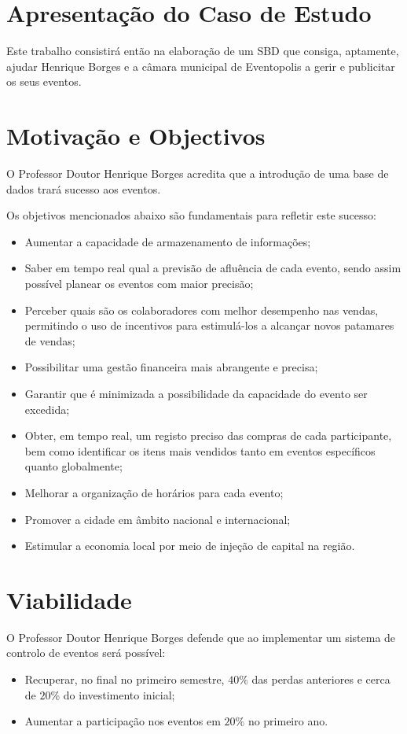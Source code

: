 \documentclass[a4paper,12pt]{scrreprt}
\begin{document}
    \section{Apresentação do Caso de Estudo}
    Este trabalho consistirá então na elaboração de um SBD que consiga, aptamente, ajudar Henrique Borges
    e a c\^amara municipal de Eventopolis a gerir e publicitar os seus eventos.
    
    \section{Motivação e Objectivos}
    O Professor Doutor Henrique Borges acredita que a introdu\c{c}\~{a}o de uma base de dados
    trar\'{a} sucesso aos eventos.

    Os objetivos mencionados abaixo s\~{a}o fundamentais para refletir este sucesso:
    \begin{itemize}
    \item Aumentar a capacidade de armazenamento de informa\c{c}\~{o}es;
    \item Saber em tempo real qual a previsão de afluência de cada evento, sendo assim possível
planear os eventos com maior precisão;
    \item Perceber quais são os colaboradores com melhor desempenho nas vendas, permitindo o
uso de incentivos para estimulá-los a alcançar novos patamares de vendas;
    \item Possibilitar uma gestão financeira mais abrangente e precisa;
    \item Garantir que é minimizada a possibilidade da capacidade do evento ser excedida;
    \item Obter, em tempo real, um registo preciso das compras de cada participante, bem como
identificar os itens mais vendidos tanto em eventos específicos quanto globalmente;
    \item Melhorar a organiza\c{c}\~{a}o de hor\'{a}rios para cada evento;
    \item Promover a cidade em \^{a}mbito nacional e internacional;
    \item Estimular a economia local por meio de inje\c{c}\~{a}o de capital na regi\~{a}o.
    \end{itemize}

        \section{Viabilidade}
        O Professor Doutor Henrique Borges defende que ao implementar um sistema de controlo de eventos
        será possível: 
        \begin{itemize}
          \item Recuperar, no final no primeiro semestre, $40\%$ das perdas anteriores e cerca de $20\%$
            do investimento inicial;
          \item Aumentar a participação nos eventos em $20\%$ no primeiro ano.
        \end{itemize}
\end{document}
